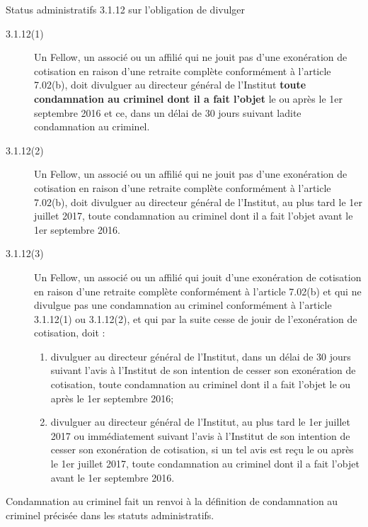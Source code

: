 \documentclass[10pt, french]{article}
\begin{document}
\begin{multicols*}{2}
\begin{rappel}{Status administratifs 3.1.12 sur l'obligation de divulger}
\begin{description}
	\item[3.1.12(1)]	Un Fellow, un associé ou un affilié qui ne jouit pas d’une exonération de cotisation en raison d’une retraite complète conformément à l’article 7.02(b), doit divulguer au directeur général de l’Institut \textbf{toute condamnation au criminel dont il a fait l’objet} le ou après le 1er septembre 2016 et ce, dans un délai de 30 jours suivant ladite condamnation au criminel. 
	\item[3.1.12(2)]	Un Fellow, un associé ou un affilié qui ne jouit pas d’une exonération de cotisation en raison d’une retraite complète conformément à l’article 7.02(b), doit divulguer au directeur général de l’Institut, au plus tard le 1er juillet 2017, toute condamnation au criminel dont il a fait l’objet avant le 1er septembre 2016.
	\item[3.1.12(3)]	Un Fellow, un associé ou un affilié qui jouit d’une exonération de cotisation en raison d’une retraite complète conformément à l’article 7.02(b) et qui ne divulgue pas une condamnation au criminel conformément à l’article 3.1.12(1) ou 3.1.12(2), et qui par la suite cesse de jouir de l’exonération de cotisation, doit :
		\begin{enumerate}[label = (\alph*)]
		\item	divulguer au directeur général de l’Institut, dans un délai de 30 jours suivant l’avis à l’Institut de son intention de cesser son exonération de cotisation, toute condamnation au criminel dont il a fait l’objet le ou après le 1er septembre 2016; 
		\item	divulguer au directeur général de l’Institut, au plus tard le 1er juillet 2017 ou immédiatement suivant l’avis à l’Institut de son intention de cesser son exonération de cotisation, si un tel avis est reçu le ou après le 1er juillet 2017, toute
condamnation au criminel dont il a fait l’objet avant le 1er septembre 2016.
		\end{enumerate}
\end{description}
\end{rappel}

\begin{definitionNOHFILLsub}[Annotation 11-1]
\og Condamnation au criminel \fg{}  fait un renvoi à la définition de \og condamnation au criminel \fg{}  précisée dans les statuts administratifs.
\end{definitionNOHFILLsub}


\end{multicols*}
\end{document}

